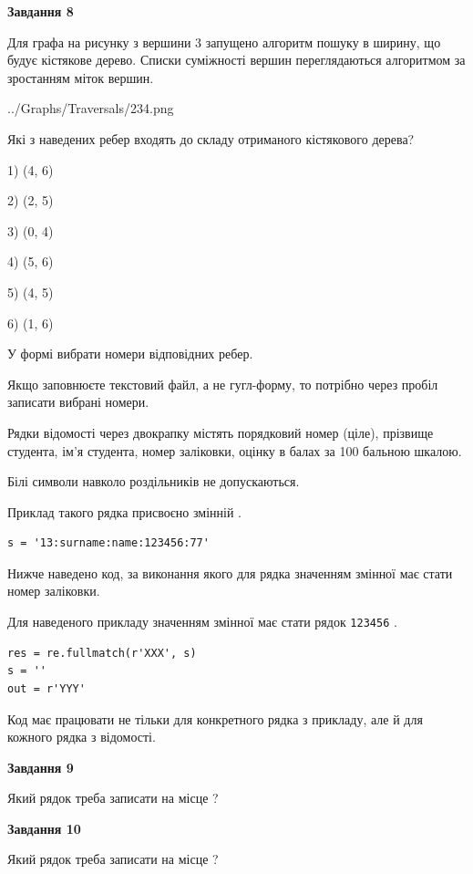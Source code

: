 \documentclass[12pt, ukrainian]{article}
\def\code#1{\Verb!#1!}
\begin{document}
{\begin {large}
{\begin {center}\textbf{Завдання 8}\end {center}}\par
Для графа на рисунку з вершини 3 запущено алгоритм пошуку в ширину, що будує кістякове дерево. Списки суміжності вершин переглядаються алгоритмом за зростанням міток вершин.\par
\begin{center}
	{../Graphs/Traversals/234.png}
\end{center}
\par Які з наведених ребер входять до складу отриманого кістякового дерева?\par
1) (4, 6)\par
2) (2, 5)\par
3) (0, 4)\par
4) (5, 6)\par
5) (4, 5)\par
6) (1, 6)\par
{\vskip 15pt} У формі вибрати номери відповідних ребер.


Якщо заповнюєте текстовий файл, а не гугл-форму, то потрібно через пробіл записа\-ти вибрані номери.\par
\newpage


Рядки відомості через двокрапку містять порядковий номер (ціле), пріз\-ви\-ще студен\-та, ім'я студента, номер заліковки, оцінку в балах за 100 бальною шкалою.

Білі символи навколо роздільників не допускаються.

Приклад такого рядка присвоєно змінній .



\begin{verbatim}
s = '13:surname:name:123456:77'
\end{verbatim}


Нижче наведено код, за виконання якого для рядка  значенням змінної  має стати номер заліковки.

Для наведеного прикладу значенням змінної  має стати рядок \code{123456} .



\begin{verbatim}
res = re.fullmatch(r'XXX', s)
s = ''
out = r'YYY'
\end{verbatim}


Код має працювати не тільки для конкретного рядка з прикладу, але й для кожного рядка з відомості.

{\begin {center}\textbf{Завдання 9}\end {center}}\par
Який рядок треба записати на місце  ?\par
\vspace{5mm}


{\begin {center}\textbf{Завдання 10}\end {center}}\par
Який рядок треба записати на місце  ?\par


\newpage


\end {large}}
\end{document}
